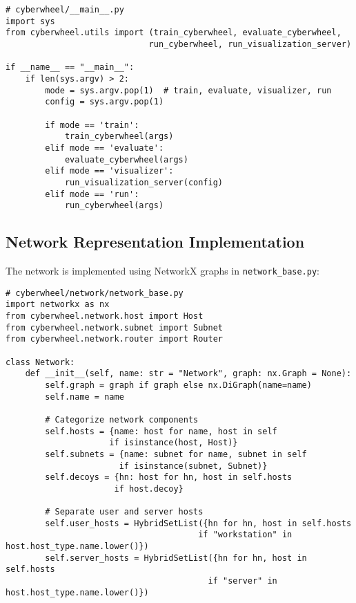 \documentclass[12pt,a4paper]{article}
\begin{document}
\begin{lstlisting}[caption=Main CLI Interface Implementation]
# cyberwheel/__main__.py
import sys
from cyberwheel.utils import (train_cyberwheel, evaluate_cyberwheel, 
                             run_cyberwheel, run_visualization_server)

if __name__ == "__main__":
    if len(sys.argv) > 2:
        mode = sys.argv.pop(1)  # train, evaluate, visualizer, run
        config = sys.argv.pop(1)
        
        if mode == 'train':
            train_cyberwheel(args)
        elif mode == 'evaluate':
            evaluate_cyberwheel(args)
        elif mode == 'visualizer':
            run_visualization_server(config)
        elif mode == 'run':
            run_cyberwheel(args)
\end{lstlisting}

\subsection{Network Representation Implementation}
The network is implemented using NetworkX graphs in \texttt{network\_base.py}:

\begin{lstlisting}[caption=Network Base Implementation]
# cyberwheel/network/network_base.py
import networkx as nx
from cyberwheel.network.host import Host
from cyberwheel.network.subnet import Subnet
from cyberwheel.network.router import Router

class Network:
    def __init__(self, name: str = "Network", graph: nx.Graph = None):
        self.graph = graph if graph else nx.DiGraph(name=name)
        self.name = name
        
        # Categorize network components
        self.hosts = {name: host for name, host in self 
                     if isinstance(host, Host)}
        self.subnets = {name: subnet for name, subnet in self 
                       if isinstance(subnet, Subnet)}
        self.decoys = {hn: host for hn, host in self.hosts 
                      if host.decoy}
        
        # Separate user and server hosts
        self.user_hosts = HybridSetList({hn for hn, host in self.hosts 
                                       if "workstation" in host.host_type.name.lower()})
        self.server_hosts = HybridSetList({hn for hn, host in self.hosts 
                                         if "server" in host.host_type.name.lower()})
\end{lstlisting}
\end{document}
